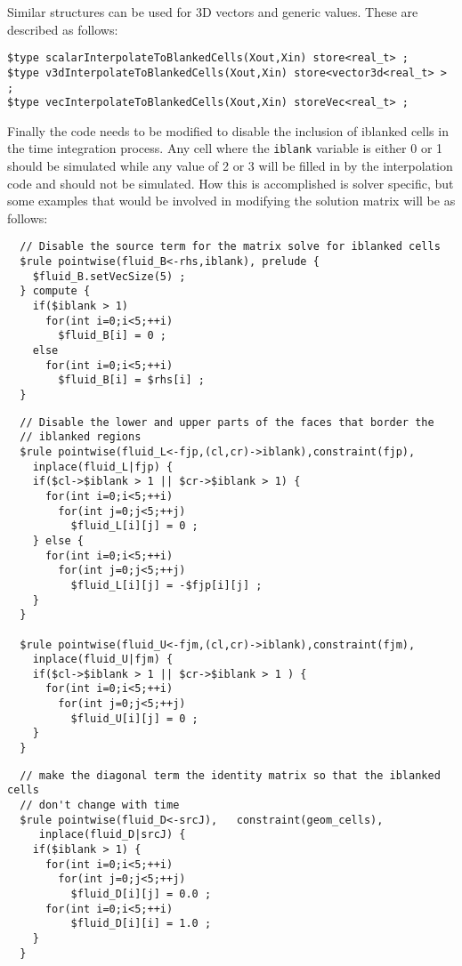 \documentclass{article}
\begin{document}
Similar structures can be used for 3D vectors and generic values.  These are described as follows:
\begin{verbatim}
$type scalarInterpolateToBlankedCells(Xout,Xin) store<real_t> ;
$type v3dInterpolateToBlankedCells(Xout,Xin) store<vector3d<real_t> > ;
$type vecInterpolateToBlankedCells(Xout,Xin) storeVec<real_t> ;
\end{verbatim}

Finally the code needs to be modified to disable the inclusion of
iblanked cells in the time integration process.  Any cell where the
{\tt iblank} variable is either 0 or 1 should be simulated while any
value of 2 or 3 will be filled in by the interpolation code and should
not be simulated.  How this is accomplished is solver specific, but
some examples that would be involved in modifying the solution matrix
will be as follows:

\begin{verbatim}
  // Disable the source term for the matrix solve for iblanked cells
  $rule pointwise(fluid_B<-rhs,iblank), prelude {
    $fluid_B.setVecSize(5) ;
  } compute {
    if($iblank > 1)
      for(int i=0;i<5;++i)
        $fluid_B[i] = 0 ;
    else
      for(int i=0;i<5;++i)
        $fluid_B[i] = $rhs[i] ;
  }
\end{verbatim}
\begin{verbatim}
  // Disable the lower and upper parts of the faces that border the
  // iblanked regions
  $rule pointwise(fluid_L<-fjp,(cl,cr)->iblank),constraint(fjp),
    inplace(fluid_L|fjp) {
    if($cl->$iblank > 1 || $cr->$iblank > 1) {
      for(int i=0;i<5;++i)
        for(int j=0;j<5;++j)
          $fluid_L[i][j] = 0 ;
    } else {
      for(int i=0;i<5;++i)
        for(int j=0;j<5;++j)
          $fluid_L[i][j] = -$fjp[i][j] ;
    }
  }

  $rule pointwise(fluid_U<-fjm,(cl,cr)->iblank),constraint(fjm),
    inplace(fluid_U|fjm) {
    if($cl->$iblank > 1 || $cr->$iblank > 1 ) {
      for(int i=0;i<5;++i)
        for(int j=0;j<5;++j)
          $fluid_U[i][j] = 0 ;
    } 
  }
\end{verbatim}
\begin{verbatim}
  // make the diagonal term the identity matrix so that the iblanked cells
  // don't change with time
  $rule pointwise(fluid_D<-srcJ),   constraint(geom_cells), 
     inplace(fluid_D|srcJ) {
    if($iblank > 1) {
      for(int i=0;i<5;++i)
        for(int j=0;j<5;++j)
          $fluid_D[i][j] = 0.0 ;
      for(int i=0;i<5;++i)
          $fluid_D[i][i] = 1.0 ;
    }
  }
\end{verbatim}
\end{document}
